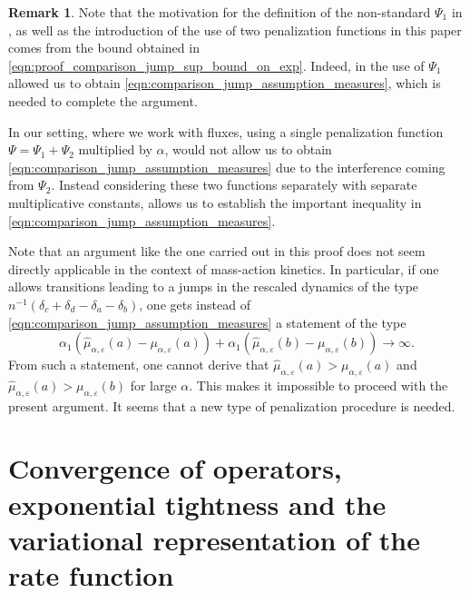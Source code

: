 \documentclass[a4paper]{article}
\numberwithin{equation}{section}
\theoremstyle{definition}
\newtheorem{remark}[theorem]{Remark}
\begin{document}
\begin{remark} \label{remark:choice_of_penalization}
	Note that the motivation for the definition of the non-standard $\Psi_1$ in \cite{Kr16b}, as well as the introduction of the use of two penalization functions in this paper comes from the bound obtained in \eqref{eqn:proof_comparison_jump_sup_bound_on_exp}. Indeed, in \cite{Kr16b} the use of $\Psi_1$ allowed us to obtain \eqref{eqn:comparison_jump_assumption_measures}, which is needed to complete the argument.
	
	In our setting, where we work with fluxes, using a single penalization function $\Psi = \Psi_1 + \Psi_2$ multiplied by $\alpha$, would not allow us to obtain \eqref{eqn:comparison_jump_assumption_measures} due to the interference coming from $\Psi_2$. Instead considering these two functions separately with separate multiplicative constants, allows us to establish the important inequality in \eqref{eqn:comparison_jump_assumption_measures}.
	
	\smallskip
	
	Note that an argument like the one carried out in this proof does not seem directly applicable in the context of mass-action kinetics. In particular, if one allows transitions leading to a jumps in the rescaled dynamics of the type $n^{-1} \left(\delta_{c} + \delta_{d} - \delta_{a} - \delta_{b}\right)$, one gets instead of  \eqref{eqn:comparison_jump_assumption_measures} a statement of the type
	\begin{equation*}
		\alpha_1(\hat{\mu}_{\alpha,\varepsilon}(a) - \mu_{\alpha,\varepsilon}(a)) + \alpha_1(\hat{\mu}_{\alpha,\varepsilon}(b) - \mu_{\alpha,\varepsilon}(b)) \rightarrow \infty.
	\end{equation*}
	From such a statement, one cannot derive that $\hat{\mu}_{\alpha,\varepsilon}(a) > \mu_{\alpha,\varepsilon}(a)$ and $\hat{\mu}_{\alpha,\varepsilon}(a) > \mu_{\alpha,\varepsilon}(b)$ for large $\alpha$. This makes it impossible to proceed with the present argument. It seems that a new type of penalization procedure is needed.
\end{remark}



\section{Convergence of operators, exponential tightness and  the variational representation of the rate function} \label{section:proof_ldp_explicit_other_steps}
\end{document}

